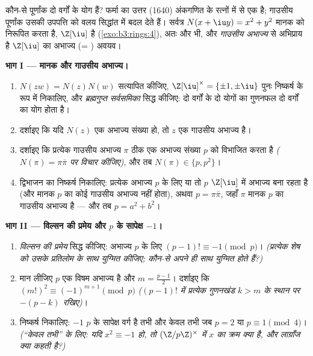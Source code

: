 \begin{problem}[{सप्ताहांत समस्या --- दो वर्गों के योग, $\Z[\iu]$ के
माध्यम से}]\label{pb:b3:rings:1}
कौन-से पूर्णांक दो वर्गों के योग हैं? फर्मा का उत्तर (1640)
अंकगणित के रत्नों में से एक है; गाउसीय पूर्णांक उसकी उपपत्ति को
वलय सिद्धांत में बदल देते हैं। सर्वत्र $N(x + \iu y) = x^2 + y^2$ मानक को निरूपित
करता है, $\Z[\iu]$  है (\cref{exo:b3:rings:4}), अतः  और  भी, और
\emph{गाउसीय अभाज्य} से अभिप्राय है $\Z[\iu]$ का अभाज्य (= )
अवयव।

\medskip
\noindent\textbf{भाग I --- मानक और गाउसीय अभाज्य।}
\begin{enumerate}
  \item $N(zw) = N(z)N(w)$ सत्यापित कीजिए, $\Z[\iu]^\times =
        \{\pm1, \pm\iu\}$ पुनः निष्कर्ष के रूप में
        निकालिए, और \emph{ब्रह्मगुप्त सर्वसमिका} सिद्ध कीजिए:
        दो वर्गों के दो योगों का गुणनफल दो वर्गों का योग होता है।
  \item दर्शाइए कि यदि $N(z)$ एक अभाज्य संख्या हो, तो $z$ एक
        गाउसीय अभाज्य है।
  \item दर्शाइए कि प्रत्येक गाउसीय अभाज्य $\pi$ ठीक एक अभाज्य
        संख्या $p$ को विभाजित करता है \emph{($N(\pi) = \pi\bar\pi$ पर विचार
        कीजिए)}, और तब $N(\pi) \in \{p, p^2\}$।
  \item द्विभाजन का निष्कर्ष निकालिए: प्रत्येक अभाज्य $p$ के
        लिए या तो $p$ $\Z[\iu]$ में अभाज्य बना रहता है (और मानक
        $p$ का कोई गाउसीय अभाज्य नहीं होता), अथवा $p = \pi\bar\pi$, जहाँ
        $\pi$ मानक $p$ का गाउसीय अभाज्य है --- और तब $p = a^2 + b^2$।
\end{enumerate}

\medskip
\noindent\textbf{भाग II --- विल्सन की प्रमेय और $p$ के सापेक्ष
$-1$।}
\begin{enumerate}[resume]
  \item \emph{विल्सन की प्रमेय} सिद्ध कीजिए: अभाज्य $p$ के लिए
        $(p-1)!
        \equiv -1 \pmod p$। \emph{(प्रत्येक शेष को उसके प्रतिलोम के साथ
        युग्मित कीजिए; कौन-से अपने ही साथ युग्मित होते हैं?)}
  \item मान लीजिए $p$ एक विषम अभाज्य है और $m = \frac{p-1}2$। दर्शाइए कि
        $(m!)^2 \equiv (-1)^{m+1} \pmod p$ \emph{($(p-1)!$ में प्रत्येक गुणनखंड $k > m$ के स्थान
        पर $-(p - k)$ रखिए)}।
  \item निष्कर्ष निकालिए: $-1$ $p$ के सापेक्ष वर्ग है तभी और
        केवल तभी जब $p = 2$ या $p
        \equiv 1 \pmod 4$। \emph{(``केवल तभी'' के लिए:
        यदि $x^2
        \equiv -1$ हो, तो $(\Z/p\Z)^\times$ में $x$ का क्रम क्या है, और
        लाग्राँज क्या कहती है?)}
\end{enumerate}


\end{problem}
